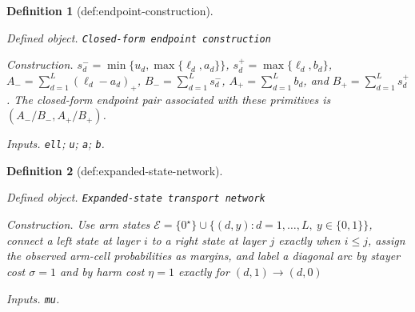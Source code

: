 \documentclass{article}
\newtheorem{definition}{Definition}
\begin{document}
\begin{definition}[def:endpoint-construction]\label{def:endpoint-construction}
\par\smallskip\noindent\emph{Defined object.} \texttt{Closed-\allowbreak{}form endpoint construction}
\par\smallskip\noindent\emph{Construction.} \(s_d^-=\min\{u_d,\max\{\ell_d,a_d\}\}\), \(s_d^+=\max\{\ell_d,b_d\}\), \(A_-=\sum_{d=1}^{L}(\ell_d-a_d)_+\), \(B_-=\sum_{d=1}^{L}s_d^-\), \(A_+=\sum_{d=1}^{L}b_d\), and \(B_+=\sum_{d=1}^{L}s_d^+\). The closed-form endpoint pair associated with these primitives is \((A_-/B_-,A_+/B_+)\).
\par\smallskip\noindent\emph{Inputs.} \texttt{ell}; \texttt{u}; \texttt{a}; \texttt{b}.
\end{definition}

\begin{definition}[def:expanded-state-network]\label{def:expanded-state-network}
\par\smallskip\noindent\emph{Defined object.} \texttt{Expanded-\allowbreak{}state transport network}
\par\smallskip\noindent\emph{Construction.} Use arm states \(\mathcal E=\{0^{\star}\}\cup\{(d,y):d=1,\ldots,L,\ y\in\{0,1\}\}\), connect a left state at layer \(i\) to a right state at layer \(j\) exactly when \(i\le j\), assign the observed arm-cell probabilities as margins, and label a diagonal arc by stayer cost \(\sigma=1\) and by harm cost \(\eta=1\) exactly for \((d,1)\to(d,0)\)
\par\smallskip\noindent\emph{Inputs.} \texttt{mu}.
\end{definition}
\end{document}
